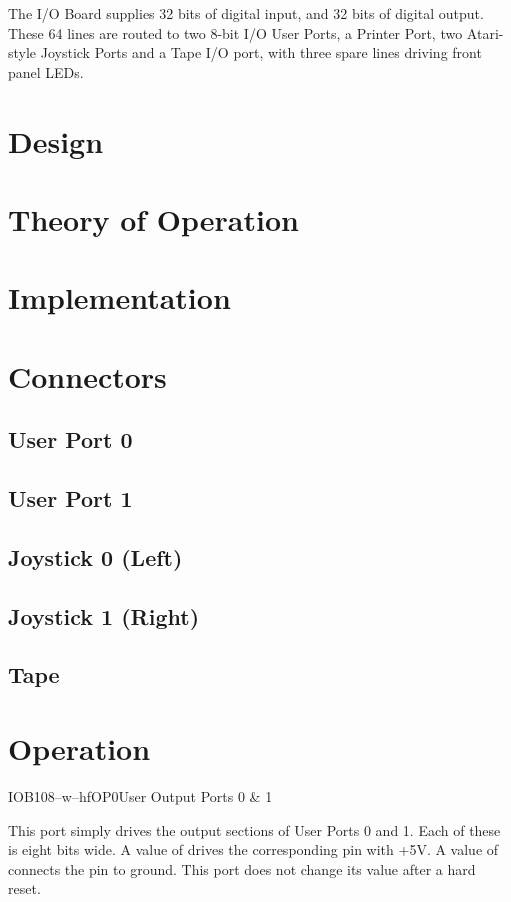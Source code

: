 
The I/O Board supplies 32 bits of digital input, and 32 bits of digital
output. These 64 lines are routed to two 8-bit I/O User Ports, a Printer Port,
two Atari-style Joystick Ports and a Tape I/O port, with three spare lines
driving front panel LEDs.

\section{Design}

\section{Theory of Operation}

\section{Implementation}

\section{Connectors}
\subsection{User Port 0}
\subsection{User Port 1}
\subsection{Joystick 0 (Left)}
\subsection{Joystick 1 (Right)}
\subsection{Tape}

\section{Operation}

\begin{ioport}{IOB}{108}{--w--hf}{OP0}{User Output Ports 0 \& 1}

  This port simply drives the output sections of User Ports 0 and 1. Each of
  these is eight bits wide. A value of  drives the corresponding pin
  with +5V. A value of  connects the pin to ground. This port does not
  change its value after a hard reset.
  
  \begin{cbitfield}
  \end{cbitfield}
\end{ioport}

